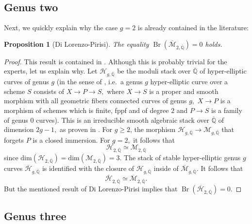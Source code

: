 \documentclass{amsart}
\newtheorem{prop}{Proposition}[section]
\theoremstyle{definition}
\theoremstyle{remark}
\DeclareMathOperator{\Br}{Br}
\begin{document}
\subsection{Genus two}
Next, we quickly explain why the case $g=2$ is already contained in the literature:
\begin{prop}[Di Lorenzo-Pirisi]\label{Proposition:genus two case}
    The equality
    $
        \Br(\overline{\mathcal{M}}_{2,\overline{\mathbb{Q}}})=0
    $
    holds.
\end{prop}
\begin{proof}
    This result is contained in \cite[Theorem A.1]{DiLorenzo-PirisiHyperEllEven}.
    Although this is probably trivial for the experts, let us explain why.
    Let $\mathcal{H}_{g,\overline{\mathbb{Q}}}$
    be the moduli stack over $\overline{\mathbb{Q}}$ of hyper-elliptic curves of genus $g$
    (in the sense of \cite{ArsieVistoliCyclicCovers}, i.e.\ a genus $g$ hyper-elliptic curve over a scheme $S$ consists of $X\rightarrow P \rightarrow S,$ where
    $X\rightarrow S$ is a proper and smooth morphism with all geometric fibers connected curves of genus $g,$ $X\rightarrow P$ is a morphism of schemes which is finite, fppf and of degree $2$ and $P\rightarrow S$ is a family of genus $0$ curves).
    This is an irreducible smooth algebraic stack over $\overline{\mathbb{Q}}$ of dimension $2g-1,$ as proven in \cite{ArsieVistoliCyclicCovers}.
    For $g\geq 2$, the morphism
    $
        \mathcal{H}_{g,\overline{\mathbb{Q}}}\rightarrow \mathcal{M}_{g,\overline{\mathbb{Q}}}
    $
    that forgets $P$
    is a closed immersion.
    For $g=2,$ it follows that
    $$
        \mathcal{H}_{2,\overline{\mathbb{Q}}}\simeq \mathcal{M}_{2,\overline{\mathbb{Q}}}
    $$
    since $\mathrm{dim} (\mathcal{H}_{2,\overline{\mathbb{Q}}})=\mathrm{dim} (\mathcal{M}_{2,\overline{\mathbb{Q}}})=3$.
    The stack of stable hyper-elliptic genus $g$ curves $\overline{\mathcal{H}}_{g,\overline{\mathbb{Q}}}$ is identified with the closure of $\mathcal{H}_{g,\overline{\mathbb{Q}}}$ inside of $\overline{\mathcal{M}}_{g,\overline{\mathbb{Q}}}.$
    It follows that
    $$
        \overline{\mathcal{H}}_{2,\overline{\mathbb{Q}}}\simeq \overline{\mathcal{M}}_{2,\overline{\mathbb{Q}}}.
    $$
    But the mentioned result of Di Lorenzo-Pirisi implies that
    $
        \Br(\overline{\mathcal{H}}_{2,\overline{\mathbb{Q}}})=0.
    $
\end{proof}

\subsection{Genus three}\label{Subsection: genus three}
\end{document}
